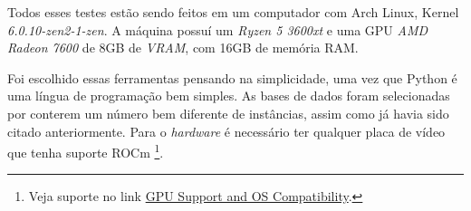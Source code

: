 Todos esses testes estão sendo feitos em um computador com Arch Linux, Kernel \emph{6.0.10-zen2-1-zen}.
A máquina possuí um \emph{Ryzen 5 3600xt} e uma GPU \emph{AMD Radeon 7600} de 8GB de \emph{VRAM}, com 16GB de memória RAM.

Foi escolhido essas ferramentas pensando na simplicidade, uma vez que Python é uma língua de programação
bem simples. As bases de dados foram selecionadas por conterem um número bem diferente de instâncias, assim
como já havia sido citado anteriormente. Para o \emph{hardware} é necessário ter qualquer placa de vídeo
que tenha suporte ROCm \footnote[2]{Veja suporte no link \href{https://rocm.docs.amd.com/en/latest/release/gpu_os_support.html}{GPU Support and OS Compatibility}.}.

